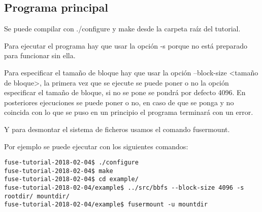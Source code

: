 \documentclass[a4paper,12pt]{article}
\begin{document}
\subsection{Programa principal}
Se puede compilar con ./configure y make desde la carpeta raíz del tutorial.
\bigskip

Para ejecutar el programa hay que usar la opción -s porque no está preparado para funcionar sin ella.
\bigskip

Para especificar el tamaño de bloque hay que usar la opción --block-size <tamaño de bloque>, la primera vez que se ejecute se puede poner o no la opción especificar el tamaño de bloque, si no se pone se pondrá por defecto 4096. En posteriores ejecuciones se puede poner o no, en caso de que se ponga y no coincida con lo que se puso en un principio el programa terminará con un error.
\bigskip

Y para desmontar el sistema de ficheros usamos el comando fusermount.
\bigskip

Por ejemplo se puede ejecutar con los siguientes comandos:

\begin{verbatim}
fuse-tutorial-2018-02-04$ ./configure 
fuse-tutorial-2018-02-04$ make
fuse-tutorial-2018-02-04$ cd example/
fuse-tutorial-2018-02-04/example$ ../src/bbfs --block-size 4096 -s rootdir/ mountdir/
fuse-tutorial-2018-02-04/example$ fusermount -u mountdir
\end{verbatim}
\end{document}
